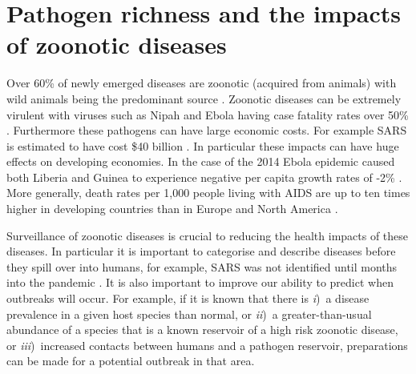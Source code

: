 
\section{Pathogen richness and the impacts of zoonotic diseases}




Over 60\% of newly emerged diseases are zoonotic (acquired from animals) with wild animals being the predominant source \cite{jones2008global, woolhouse2006host, taylor2001risk}.
Zoonotic diseases can be extremely virulent with viruses such as Nipah  and Ebola having case fatality rates over 50\% \cite{luby2009recurrent, lefebvre2014case}.
Furthermore these pathogens can have large economic costs.
For example SARS is estimated to have cost \$40 billion \cite{knobler2004learning}.
In particular these impacts can have huge effects on developing economies.
In the case of the 2014 Ebola epidemic caused both Liberia and Guinea to experience negative per capita growth rates of -2\% \cite{ebolaWorldbank, ebola2015worldbank}.
More generally, death rates per 1,000 people living with AIDS are up to ten times higher in developing countries than in Europe and North America \cite{granich2015trends}.


Surveillance of zoonotic diseases is crucial to reducing the health impacts of these diseases.
In particular it is important to categorise and describe diseases before they spill over into humans, for example, SARS was not identified until months into the pandemic \cite{drosten2003identification}. 
It is also important to improve our ability to predict when outbreaks will occur. 
For example, if it is known that there is \textit{i})~a disease prevalence in a given host species than normal, or \textit{ii})~a greater-than-usual abundance of a species that is a known reservoir of a high risk zoonotic disease, or \textit{iii})~increased contacts between humans and a pathogen reservoir, preparations can be made for a potential outbreak in that area.

